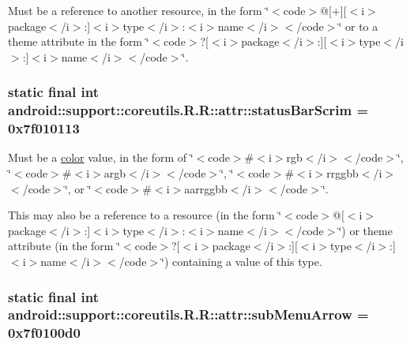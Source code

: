 Must be a reference to another resource, in the form \char`\"{}$<$code$>$@\mbox{[}+\mbox{]}\mbox{[}$<$i$>$package$<$/i$>$:\mbox{]}$<$i$>$type$<$/i$>$:$<$i$>$name$<$/i$>$$<$/code$>$\char`\"{} or to a theme attribute in the form \char`\"{}$<$code$>$?\mbox{[}$<$i$>$package$<$/i$>$:\mbox{]}\mbox{[}$<$i$>$type$<$/i$>$:\mbox{]}$<$i$>$name$<$/i$>$$<$/code$>$\char`\"{}. \hypertarget{classandroid_1_1support_1_1coreutils_1_1_r_1_1attr_3fe7bf556d6c28c175bafd4e3da42d2f}{
\subsubsection[{statusBarScrim}]{\setlength{\rightskip}{0pt plus 5cm}static final int android::support::coreutils.R.R::attr::statusBarScrim = 0x7f010113}}
\label{classandroid_1_1support_1_1coreutils_1_1_r_1_1attr_3fe7bf556d6c28c175bafd4e3da42d2f}


Must be a \hyperlink{classandroid_1_1support_1_1coreutils_1_1_r_1_1color}{color} value, in the form of \char`\"{}$<$code$>$\#$<$i$>$rgb$<$/i$>$$<$/code$>$\char`\"{}, \char`\"{}$<$code$>$\#$<$i$>$argb$<$/i$>$$<$/code$>$\char`\"{}, \char`\"{}$<$code$>$\#$<$i$>$rrggbb$<$/i$>$$<$/code$>$\char`\"{}, or \char`\"{}$<$code$>$\#$<$i$>$aarrggbb$<$/i$>$$<$/code$>$\char`\"{}. 

This may also be a reference to a resource (in the form \char`\"{}$<$code$>$@\mbox{[}$<$i$>$package$<$/i$>$:\mbox{]}$<$i$>$type$<$/i$>$:$<$i$>$name$<$/i$>$$<$/code$>$\char`\"{}) or theme attribute (in the form \char`\"{}$<$code$>$?\mbox{[}$<$i$>$package$<$/i$>$:\mbox{]}\mbox{[}$<$i$>$type$<$/i$>$:\mbox{]}$<$i$>$name$<$/i$>$$<$/code$>$\char`\"{}) containing a value of this type. \hypertarget{classandroid_1_1support_1_1coreutils_1_1_r_1_1attr_49e58778169bbf4b0c25408fad60e803}{
\subsubsection[{subMenuArrow}]{\setlength{\rightskip}{0pt plus 5cm}static final int android::support::coreutils.R.R::attr::subMenuArrow = 0x7f0100d0}}
\label{classandroid_1_1support_1_1coreutils_1_1_r_1_1attr_49e58778169bbf4b0c25408fad60e803}


